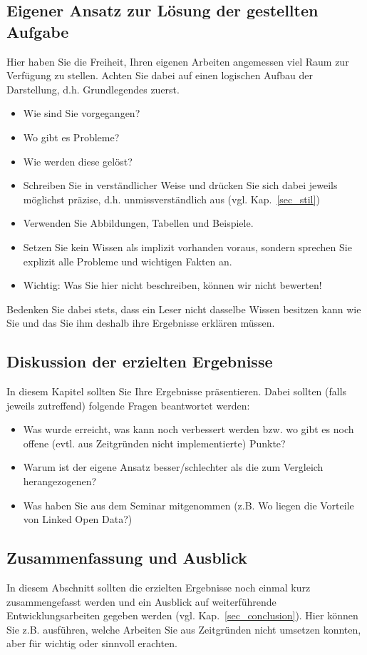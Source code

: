 \subsection{Eigener Ansatz zur Lösung der gestellten Aufgabe}
Hier haben Sie die Freiheit, Ihren eigenen Arbeiten angemessen viel Raum zur Verfügung zu stellen.
Achten Sie dabei auf einen logischen Aufbau der Darstellung, d.h. Grundlegendes zuerst.
\begin{itemize}
\item Wie sind Sie vorgegangen?
\item Wo gibt es Probleme?
\item Wie werden diese gelöst?
\item Schreiben Sie in verständlicher Weise und drücken Sie sich dabei jeweils möglichst präzise, d.h. unmissverständlich aus (vgl. Kap.~\ref{sec_stil})
\item Verwenden Sie Abbildungen, Tabellen und Beispiele.
\item Setzen Sie kein Wissen als implizit vorhanden voraus, sondern sprechen Sie explizit alle Probleme und wichtigen Fakten an.
\item Wichtig: Was Sie hier nicht beschreiben, können wir nicht bewerten!
\end{itemize}
Bedenken Sie dabei stets, dass ein Leser nicht dasselbe Wissen besitzen kann wie Sie und das Sie ihm deshalb ihre Ergebnisse erklären müssen.


\subsection{Diskussion der erzielten Ergebnisse}
In diesem Kapitel sollten Sie Ihre Ergebnisse präsentieren.
Dabei sollten (falls jeweils zutreffend) folgende Fragen beantwortet werden:
\begin{itemize}
\item Was wurde erreicht, was kann noch verbessert werden bzw. wo gibt es noch offene (evtl. aus Zeitgründen nicht implementierte) Punkte?
\item Warum ist der eigene Ansatz besser/schlechter als die zum Vergleich herangezogenen?
\item Was haben Sie aus dem Seminar mitgenommen (z.B. Wo liegen die Vorteile von Linked Open Data?)
\end{itemize}


\subsection{Zusammenfassung und Ausblick}

In diesem Abschnitt sollten die erzielten Ergebnisse noch einmal kurz zusammengefasst werden und ein Ausblick auf weiterführende Entwicklungsarbeiten gegeben werden (vgl. Kap.~\ref{sec_conclusion}). Hier können Sie z.B. ausführen, welche Arbeiten Sie aus Zeitgründen nicht umsetzen konnten, aber für wichtig oder sinnvoll erachten.
